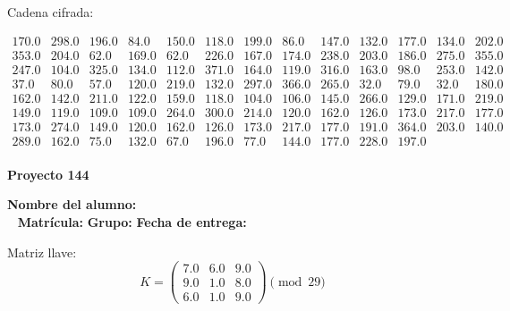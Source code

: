 \documentclass[12pt]{article}
\begin{document}
Cadena cifrada:
\begin{center}
$\begin{array}{lllllllllllll}
170.0 & 298.0 & 196.0 & 84.0 & 150.0 & 118.0 & 199.0 & 86.0 & 147.0 & 132.0 & 177.0 & 134.0 & 202.0\\
353.0 & 204.0 & 62.0 & 169.0 & 62.0 & 226.0 & 167.0 & 174.0 & 238.0 & 203.0 & 186.0 & 275.0 & 355.0\\
247.0 & 104.0 & 325.0 & 134.0 & 112.0 & 371.0 & 164.0 & 119.0 & 316.0 & 163.0 & 98.0 & 253.0 & 142.0\\
37.0 & 80.0 & 57.0 & 120.0 & 219.0 & 132.0 & 297.0 & 366.0 & 265.0 & 32.0 & 79.0 & 32.0 & 180.0\\
162.0 & 142.0 & 211.0 & 122.0 & 159.0 & 118.0 & 104.0 & 106.0 & 145.0 & 266.0 & 129.0 & 171.0 & 219.0\\
149.0 & 119.0 & 109.0 & 109.0 & 264.0 & 300.0 & 214.0 & 120.0 & 162.0 & 126.0 & 173.0 & 217.0 & 177.0\\
173.0 & 274.0 & 149.0 & 120.0 & 162.0 & 126.0 & 173.0 & 217.0 & 177.0 & 191.0 & 364.0 & 203.0 & 140.0\\
289.0 & 162.0 & 75.0 & 132.0 & 67.0 & 196.0 & 77.0 & 144.0 & 177.0 & 228.0 & 197.0\\
\end{array}$
\end{center}

\newpage


\textbf{Proyecto 144}

\textbf{Nombre del alumno:} \underline{\hspace{13cm}}\\\
\vspace{1cm}
\textbf{Matrícula:} \underline{\hspace{4cm}} \hspace{1cm}
\textbf{Grupo:} \underline{\hspace{2cm}}
\textbf{Fecha de entrega:} \underline{\hspace{2cm}}

\medskip

Matriz llave:
\[
K = \begin{pmatrix}
7.0 & 6.0 & 9.0\\
9.0 & 1.0 & 8.0\\
6.0 & 1.0 & 9.0
\end{pmatrix} \pmod{29}
\]
\end{document}
